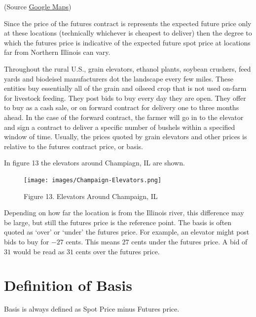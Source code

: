 \documentclass[
  letterpaper,
  DIV=11,
  numbers=noendperiod]{scrreprt}
\begin{document}
(Source
\href{https://www.google.com/maps/place/Burns+Harbor,+IN/@41.740398,-87.7248706,10.5z/data=!4m5!3m4!1s0x8811bc3712ab828d:0x98301a46014d10b5!8m2!3d41.6258708!4d-87.1333676}{Google
Maps})

Since the price of the futures contract is represents the expected
future price only at these locations (technically whichever is cheapest
to deliver) then the degree to which the futures price is indicative of
the expected future spot price at locations far from Northern Illinois
can vary.

Throughout the rural U.S., grain elevators, ethanol plants, soybean
crushers, feed yards and biodeisel manufacturers dot the landscape every
few miles. These entities buy essentially all of the grain and oilseed
crop that is not used on-farm for livestock feeding. They post bids to
buy every day they are open. They offer to buy as a cash sale, or on
forward contract for delivery one to three months ahead. In the case of
the forward contract, the farmer will go in to the elevator and sign a
contract to deliver a specific number of bushels within a specified
window of time. Usually, the prices quoted by grain elevators and other
prices is relative to the futures contract price, or basis.

In figure 13 the elevators around Champiagn, IL are shown.

\begin{figure}[H]

{\centering \texttt{[image: images/Champaign-Elevators.png]}

}

\caption{Figure 13. Elevators Around Champaign, IL}

\end{figure}%

Depending on how far the location is from the Illinois river, this
difference may be large, but still the futures price is the reference
point. The basis is often quoted as `over' or `under' the futures price.
For example, an elevator might post bids to buy for \(-27\) cents. This
means \(27\) cents under the futures price. A bid of \(31\) would be
read as \(31\) cents over the futures price.

\section{Definition of Basis}\label{definition-of-basis}

Basis is always defined as Spot Price minus Futures price.
\end{document}
